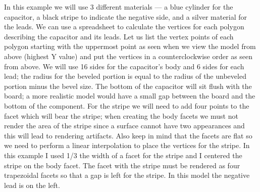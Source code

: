 \documentclass[a4paper]{article}
\begin{document}
In this example we will use 3 different materials --- a blue cylinder for the capacitor, a black stripe to
indicate the negative side, and a silver material for the leads. We can use a spreadsheet to calculate the
vertices for each polygon describing the capacitor and its leads. Let us list the vertex points of each
polygon starting with the uppermost point as seen when we view the model from above (highest Y value) and
put the vertices in a counterclockwise order as seen from above.
We will use 16 sides for the capacitor's body and 6 sides for each lead; the radius for the beveled portion is
equal to the radius of the unbeveled portion minus the bevel size. The bottom of the capacitor will sit flush
with the board; a more realistic model would have a small gap between the board and the bottom of the
component. For the stripe we will need to add four points to the facet which will bear the stripe; when creating
the body facets we must not render the area of the stripe since a surface cannot have two appearances and this
will lead to rendering artifacts. Also keep in mind that the facets are flat so we need to perform a linear
interpolation to place the vertices for the stripe.  In this example I used 1/3 the width of a facet for the stripe
and I centered the stripe on the body facet. The facet with the stripe must be rendered as four trapezoidal facets
so that a gap is left for the stripe. In this model the negative lead is on the left.
\end{document}
